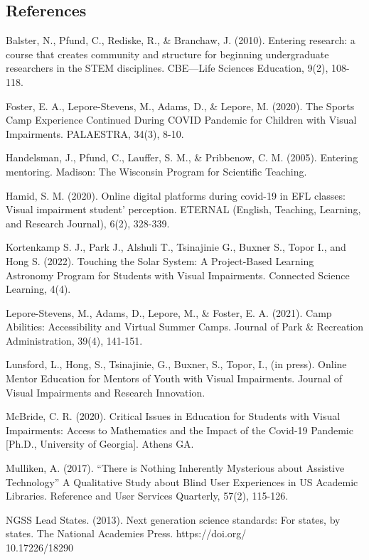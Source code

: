 \documentclass[11pt]{sig-alternate}
\begin{document}
\begin{large}
{ 
\section*{References}\par 

\leftskip 0.25in
\parindent -0.25in 

Balster, N., Pfund, C., Rediske, R., \& Branchaw, J. (2010). Entering research: a course that creates community and structure for beginning undergraduate researchers in the STEM disciplines. CBE—Life Sciences Education, 9(2), 108-118.

Foster, E. A., Lepore-Stevens, M., Adams, D., \& Lepore, M. (2020). The Sports Camp Experience Continued During COVID Pandemic for Children with Visual Impairments. PALAESTRA, 34(3), 8-10. 

Handelsman, J., Pfund, C., Lauffer, S. M., \& Pribbenow, C. M. (2005). Entering mentoring. Madison: The Wisconsin Program for Scientific Teaching.

Hamid, S. M. (2020). Online digital platforms during covid-19 in EFL classes: Visual impairment student’ perception. ETERNAL (English, Teaching, Learning, and Research Journal), 6(2), 328-339. 

Kortenkamp S. J., Park J., Alshuli T., Tsinajinie G., Buxner S., Topor I., and Hong S. (2022). Touching the Solar System: A Project-Based Learning Astronomy Program for Students with Visual Impairments. Connected Science Learning, 4(4).

Lepore-Stevens, M., Adams, D., Lepore, M., \& Foster, E. A. (2021). Camp Abilities: Accessibility and Virtual Summer Camps. Journal of Park \& Recreation Administration, 39(4), 141-151. 

Lunsford, L., Hong, S., Tsinajinie, G., Buxner, S., Topor, I., (in press). Online Mentor Education for Mentors of Youth with Visual Impairments. Journal of Visual Impairments and Research Innovation.

McBride, C. R. (2020). Critical Issues in Education for Students with Visual Impairments: Access to Mathematics and the Impact of the Covid-19 Pandemic [Ph.D., University of Georgia]. Athens GA. 

Mulliken, A. (2017). “There is Nothing Inherently Mysterious about Assistive Technology” A Qualitative Study about Blind User Experiences in US Academic Libraries. Reference and User Services Quarterly, 57(2), 115-126. 

NGSS Lead States. (2013). Next generation science standards: For states, by states. The National Academies Press. https://doi.org/\\10.17226/18290

}
\end{large}
\end{document}
